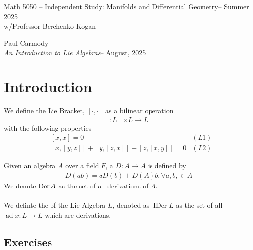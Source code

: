 \documentclass[12pt,a4paper]{report}
\newcommand{\CLASSNAME}{Math 5050 -- Independent Study: Manifolds and Differential Geometry}
\newcommand{\STUDENTNAME}{Paul Carmody}
\newcommand{\ASSIGNMENT}{\textit{An Introduction to Lie Algebras}}
\newcommand{\DUEDATE}{August, 2025}
\newcommand{\PROFESSOR}{Professor Berchenko-Kogan}
\newcommand{\SEMESTER}{Summer 2025}
\newcommand{\AD}{\operatorname{ad}}
\newcommand{\IDER}{\operatorname{IDer}}
\begin{document}
\begin{center}
	\Large{\CLASSNAME -- \SEMESTER} \\
	\large{ w/\PROFESSOR}
\end{center}
\begin{center}
	\STUDENTNAME \\
	\ASSIGNMENT -- \DUEDATE\\
\end{center} 

\chapter{Introduction}

\begin{definition}

We define the Lie Bracket, $[\cdot, \cdot]$ as a bilinear operation
\begin{align*}
	[\cdot,\cdot] : L &\times L \to L
\end{align*}with the following properties
\begin{align*}
	&[x,x] =0 & (L1)\\
	&[x, [y,z]] + [y, [z,x]] + [z, [x,y]] =0 & (L2)
\end{align*}
\end{definition}

\begin{definition}[Derivation of $A$]

Given an algebra $A$ over a field $F$, a  $D: A \to A$ is defined by 
\begin{align*}
	D(ab) = aD(b)+D(A)b, \forall a,b, \in A
\end{align*}We denote $\operatorname{Der} A$ as the set of all derivations of $A$.\\ \\

We definte the  of the Lie Algebra $L$, denoted as $\IDER L$ as the set of all $\AD x: L \to L$ which are derivations.
\end{definition}


\section{Exercises}
\end{document}
